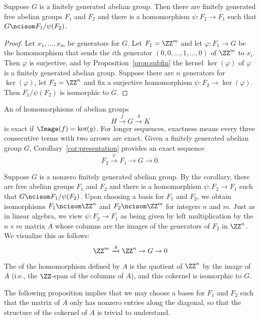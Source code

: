 \begin{corollary}
  \label{cor:presentation}
  Suppose $G$ is a finitely generated abelian group. Then there are
  finitely generated free abelian groups $F_1$ and $F_2$ and there is
  a homomorphism $\psi:F_2 \to F_1$ such that $G \ncisom F_1/\psi(F_2)$.
\end{corollary}
\begin{proof}
  Let $x_1,\dots, x_m$ be generators for $G$. Let $F_1=\ZZ^m$ and let
  $\varphi:F_1\to G$ be the homomorphism that sends the $i$th generator
  $(0,0,\dots,1,\dots,0)$ of $\ZZ^m$ to $x_i$. Then $\varphi$ is
  surjective, and by Proposition~\ref{prop:subfin} the
  kernel $\ker(\varphi)$ of $\varphi$ is a finitely generated abelian
  group. Suppose there are $n$ generators for $\ker(\varphi)$, let
  $F_2 = \ZZ^n$ and fix a surjective homomorphism $\psi:F_2
  \to \ker(\varphi)$. Then $F_1 / \psi(F_2)$ is isomorphic to $G$.
\end{proof}

An  of homomorphisms of abelian groups
$$
  H \xrightarrow{f} G \xrightarrow{g} K
$$
is exact if $\Image(f) = \ker(g)$.
For longer sequences, exactness means every three consecutive
terms with two arrows are exact.
Given a finitely generated abelian group $G$,
Corollary~\ref{cor:presentation} provides an exact sequence
$$
  F_2 \xrightarrow{\psi} F_1 \to G \to 0.
$$

Suppose $G$ is a nonzero finitely generated abelian group.  By the
corollary, there are free abelian groups $F_1$ and $F_2$ and there is a
homomorphism $\psi:F_2 \to F_1$ such that $G\ncisom F_1/\psi(F_2)$.
Upon choosing a basis for $F_1$ and $F_2$, we obtain isomorphisms
$F_1\ncisom \ZZ^n$ and $F_2\ncisom \ZZ^m$ for integers $n$ and $m$.
Just as in linear algebra, we view $\psi:F_2\to F_1$ as being given
by left multiplication by the $n\times m$ matrix $A$ whose columns
are the images of the generators of $F_2$ in $\ZZ^n$.  We visualize
this as follows:
$$
  \ZZ^m \xrightarrow{A} \ZZ^n \to G \to 0
$$

The  of the homomorphism defined by $A$ is the quotient
of $\ZZ^n$ by the image of $A$ (i.e., the $\ZZ$-span of the columns of $A$),
and this cokernel is isomorphic to $G$.

The following proposition implies that we may choose a bases for $F_1$
and $F_2$ such that the matrix of $A$ only has nonzero entries along
the diagonal, so that the structure of the cokernel of $A$ is
trivial to understand.

